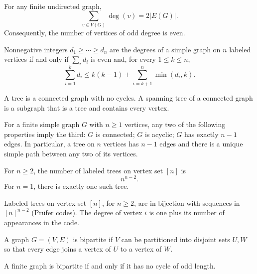 \begin{theorem}
For any finite undirected graph,
\[
 \sum_{v\in V(G)}\deg(v)=2|E(G)|.
\]
Consequently, the number of vertices of odd degree is even.
\end{theorem}

\begin{theorem}
Nonnegative integers $d_1\ge\cdots\ge d_n$ are the degrees of a simple graph on $n$ labeled vertices if and only if $\sum_i d_i$ is even and, for every $1\le k\le n$,
\[
 \sum_{i=1}^k d_i\le k(k-1)+\sum_{i=k+1}^n\min(d_i,k).
\]
\end{theorem}


\begin{definition}
A tree is a connected graph with no cycles. A spanning tree of a connected graph is a subgraph that is a tree and contains every vertex.
\end{definition}

\begin{theorem}
For a finite simple graph $G$ with $n\ge1$ vertices, any two of the following properties imply the third: $G$ is connected; $G$ is acyclic; $G$ has exactly $n-1$ edges. In particular, a tree on $n$ vertices has $n-1$ edges and there is a unique simple path between any two of its vertices.
\end{theorem}

\begin{theorem}
For $n\ge2$, the number of labeled trees on vertex set $[n]$ is
\[
 n^{n-2}.
\]
For $n=1$, there is exactly one such tree.
\end{theorem}

\begin{theorem}
Labeled trees on vertex set $[n]$, for $n\ge2$, are in bijection with sequences in $[n]^{n-2}$ (Pr\"ufer codes). The degree of vertex $i$ is one plus its number of appearances in the code.
\end{theorem}

\begin{definition}
A graph $G=(V, E)$ is bipartite if $V$ can be partitioned into disjoint sets $U, W$ so that every edge joins a vertex of $U$ to a vertex of $W$.
\end{definition}

\begin{theorem}
A finite graph is bipartite if and only if it has no cycle of odd length.
\end{theorem}


